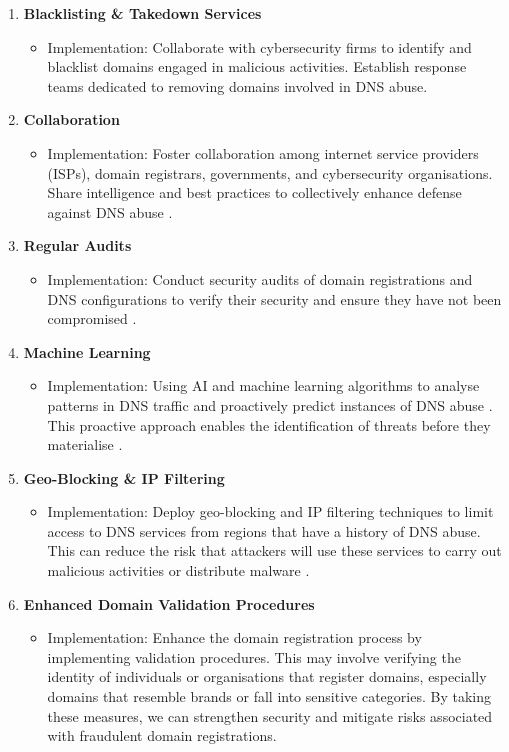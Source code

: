 \begin{enumerate}
    \item \textbf{Blacklisting \& Takedown Services}
    \begin{itemize}
        \item Implementation: Collaborate with cybersecurity firms to identify and blacklist domains engaged in malicious activities. Establish response teams dedicated to removing domains involved in DNS abuse.
    \end{itemize}
    \item \textbf{Collaboration}
    \begin{itemize}
        \item Implementation: Foster collaboration among internet service providers (ISPs), domain registrars, governments, and cybersecurity organisations. Share intelligence and best practices to collectively enhance defense against DNS abuse \cite{skopik2017collaborative}.
    \end{itemize}
    \item \textbf{Regular Audits}
    \begin{itemize}
        \item Implementation: Conduct security audits of domain registrations and DNS configurations to verify their security and ensure they have not been compromised \cite{coronado2014auditing}.
    \end{itemize}
    \item \textbf{Machine Learning}
    \begin{itemize}
        \item Implementation: Using AI and machine learning algorithms to analyse patterns in DNS traffic and proactively predict instances of DNS abuse \cite{icannndnssec}. This proactive approach enables the identification of threats before they materialise \cite{tsukerman2019machine}.
    \end{itemize}
    \item \textbf{Geo-Blocking \& IP Filtering}
    \begin{itemize}
        \item Implementation: Deploy geo-blocking and IP filtering techniques to limit access to DNS services from regions that have a history of DNS abuse. This can reduce the risk that attackers will use these services to carry out malicious activities or distribute malware \cite{meeseedited}.
    \end{itemize}
    \item \textbf{Enhanced Domain Validation Procedures}
    \begin{itemize}
        \item Implementation: Enhance the domain registration process by implementing validation procedures. This may involve verifying the identity of individuals or organisations that register domains, especially domains that resemble brands or fall into sensitive categories. By taking these measures, we can strengthen security and mitigate risks associated with fraudulent domain registrations.
    \end{itemize}
\end{enumerate}

